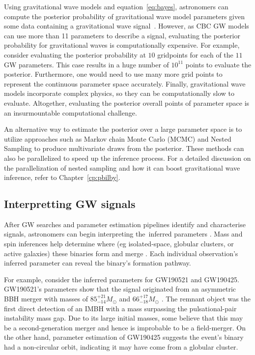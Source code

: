 Using gravitational wave models and equation~\ref{eq:bayes}, astronomers can compute the posterior probability of gravitational wave model parameters given some data containing a gravitational wave signal~\cite{abbott2018prospects}.
However, as CBC GW models can use more than 11 parameters to describe a signal, evaluating the posterior probability for gravitational waves is computationally expensive. 
For example, consider evaluating the posterior probability at $10$ gridpoints for each of the $11$ GW parameters.
This case results in a huge number of $10^11$ points to evaluate the posterior.
Furthermore, one would need to use many more grid points to represent the continuous parameter space accurately.
Finally, gravitational wave models incorporate complex physics, so they can be computationally slow to evaluate. 
Altogether, evaluating the posterior overall points of parameter space is an insurmountable computational challenge.

An alternative way to estimate the posterior over a large parameter space is to utilize approaches such as Markov chain Monte Carlo (MCMC) and Nested Sampling to produce multivariate draws from the posterior. 
These methods can also be parallelized to speed up the inference process. 
For a detailed discussion on the parallelization of nested sampling and how it can boost gravitational wave inference, refer to Chapter~\ref{cp:pbilby}. 


\subsection{Interpretting GW signals}

After GW searches and parameter estimation pipelines  identify and characterise signals, astronomers can begin interpreting the inferred parameters .
Mass and spin inferences help determine where (eg isolated-space, globular clusters, or active galaxies) these binaries form and merge .
Each individual observation's inferred parameter can reveal the binary's formation pathway.

For example, consider the inferred parameters for GW190521 and GW190425. 
GW190521's parameters show that the signal originated from an asymmetric BBH merger with masses of $85^{+21}_{-14}M_{\odot}$ and $66^{+17}_{-18}M_{\odot}$ \citep{Abbott:2020tfl}.
The remnant object was the first direct detection of an IMBH with a mass surpassing the pulsational-pair instability mass gap.
Due to its large initial masses, some believe that this may be a second-generation merger and hence is improbable to be a field-merger. 
On the other hand,  parameter estimation of GW190425 suggests the event's binary had a non-circular orbit, indicating it may have come from a globular cluster.

